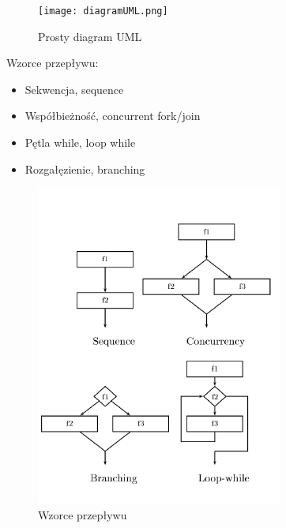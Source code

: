 \documentclass[a4paper, 11pt]{article}
\begin{document}
	\begin{figure}[H]
		\centerline{\texttt{[image: diagramUML.png]}}
		\caption{Prosty diagram UML}

	\end{figure}%
Wzorce przepływu:
	\begin{itemize}
	\item Sekwencja, sequence
	\item Współbieżność, concurrent fork/join
	\item Pętla while, loop while
	\item Rozgałęzienie, branching
	\end{itemize}
	\begin{figure}[H]
		\centerline{\includegraphics[scale=1.5]{workflows}}
		\caption{Wzorce przepływu}
	\end{figure}%
	
\end{document}
